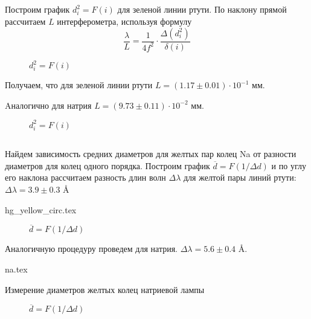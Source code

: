 \subsection{}
Построим график $d^2_i = F(i)$ для зеленой линии ртути. По наклону прямой
рассчитаем $L$ интерферометра, используя формулу
$$
\frac{\lambda}{L} = \frac{1}{4f^2} \cdot \frac{\Delta (d^2_i)}{\delta (i)}
$$

\begin{figure}[h!]
  \caption{$d^2_i = F(i)$}
  \label{img::di_hg}
\end{figure}

Получаем, что для зеленой линии ртути $L = (1.17 \pm 0.01) \cdot 10^{-1}$ мм.

Aналогично для натрия $L = (9.73 \pm 0.11) \cdot 10^{-2}$ мм.

\begin{figure}[h!]
  \caption{$d^2_i = F(i)$}
  \label{img::di_na}
\end{figure}

\subsection{}

Найдем зависимость средних диаметров для желтых пар колец Na от разности диаметров
для колец одного порядка. Построим график $\overline{d} = F(1/\Delta d)$ и по
углу его наклона рассчитаем разность длин волн $\Delta \lambda$ для желтой пары
линий ртути: $\Delta \lambda = 3.9 \pm 0.3$ \AA

{hg_yellow_circ.tex}

\begin{figure}[h!]
  \caption{$\overline{d} = F(1/\Delta d)$}
  \label{img::avg_diam_hg}
\end{figure}

Аналогичную процедуру проведем для натрия. $\Delta \lambda = 5.6 \pm 0.4$ \AA.

\begin{table}[h!]
  \begin{center}
    {na.tex}
  \end{center}
  \caption{Измерение диаметров желтых колец натриевой лампы}
\end{table}

\begin{figure}[h!]
  \caption{$\overline{d} = F(1/\Delta d)$}
  \label{img::avg_diam_na}
\end{figure}



